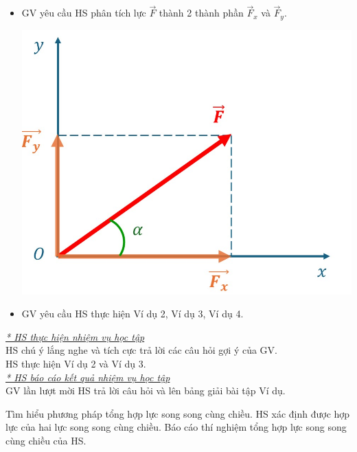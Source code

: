{\begin{itemize}[label=-]
		\item GV yêu cầu HS phân tích lực $\vec{F}$ thành 2 thành phần $\vec{F}_x$ và $\vec{F}_y$.
		\begin{center}
			\includegraphics[scale=0.5]{figs/G10-BAI9-9}
		\end{center}
		\item GV yêu cầu HS thực hiện Ví dụ 2, Ví dụ 3, Ví dụ 4.
	\end{itemize}
	\textit{\underline{* HS thực hiện nhiệm vụ học tập}}\\
	HS chú ý lắng nghe và tích cực trả lời các câu hỏi gợi ý của GV.\\
	HS thực hiện Ví dụ 2 và Ví dụ 3.\\
	\textit{\underline{* HS báo cáo kết quả nhiệm vụ học tập}}\\
	GV lần lượt mời HS trả lời câu hỏi và lên bảng giải bài tập Ví dụ.
}
\hoatdong
{Tìm hiểu phương pháp tổng hợp lực song song cùng chiều.
}
{HS xác định được hợp lực của hai lực song song cùng chiều.
}
{Báo cáo thí nghiệm tổng hợp lực song song cùng chiều của HS.
}
